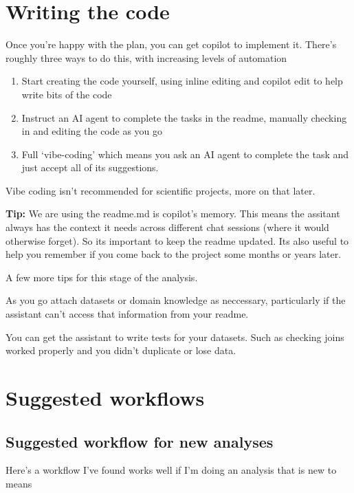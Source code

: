 \documentclass[
  letterpaper,
  DIV=11,
  numbers=noendperiod]{scrreprt}
\providecommand{\tightlist}{%
  \setlength{\itemsep}{0pt}\setlength{\parskip}{0pt}}\usepackage{longtable,booktabs,array}
\begin{document}
\section{Writing the code}\label{writing-the-code}

Once you're happy with the plan, you can get copilot to implement it.
There's roughly three ways to do this, with increasing levels of
automation

\begin{enumerate}
\def\labelenumi{\arabic{enumi}.}
\tightlist
\item
  Start creating the code yourself, using inline editing and copilot
  edit to help write bits of the code
\item
  Instruct an AI agent to complete the tasks in the readme, manually
  checking in and editing the code as you go
\item
  Full `vibe-coding' which means you ask an AI agent to complete the
  task and just accept all of its suggestions.
\end{enumerate}

Vibe coding isn't recommended for scientific projects, more on that
later.

\textbf{Tip:} We are using the readme.md is copilot's memory. This means
the assitant always has the context it needs across different chat
sessions (where it would otherwise forget). So its important to keep the
readme updated. Its also useful to help you remember if you come back to
the project some months or years later.

A few more tips for this stage of the analysis.

As you go attach datasets or domain knowledge as neccessary,
particularly if the assistant can't access that information from your
readme.

You can get the assistant to write tests for your datasets. Such as
checking joins worked properly and you didn't duplicate or lose data.

\section{Suggested workflows}\label{suggested-workflows}

\subsection{Suggested workflow for new
analyses}\label{suggested-workflow-for-new-analyses}

Here's a workflow I've found works well if I'm doing an analysis that is
new to means
\end{document}
